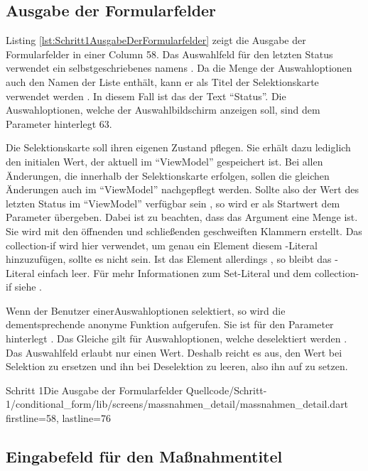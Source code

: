 \subsection{Ausgabe der Formularfelder}

Listing \ref{lst:Schritt1AusgabeDerFormularfelder} zeigt die Ausgabe der Formularfelder in einer Column 58.
Das Auswahlfeld für den letzten Status verwendet ein selbstgeschriebenes  namens  .
Da die Menge der Auswahloptionen auch den Namen der Liste enthält, kann er als Titel der Selektionskarte verwendet werden . In diesem Fall ist das der Text \enquote{Status}.
Die Auswahloptionen, welche  der Auswahlbildschirm anzeigen soll, sind dem Parameter  hinterlegt 63.

Die Selektionskarte soll ihren eigenen Zustand pflegen.
Sie erhält dazu lediglich den initialen Wert, der aktuell im \enquote{ViewModel} gespeichert ist.
Bei allen Änderungen, die innerhalb der Selektionskarte erfolgen, sollen die gleichen Änderungen auch im \enquote{ViewModel} nachgepflegt werden.
Sollte also der Wert des letzten Status im \enquote{ViewModel} verfügbar sein , so wird er als Startwert dem Parameter   übergeben.
Dabei ist zu beachten, dass das Argument eine Menge ist.
Sie wird mit den  öffnenden und schließenden geschweiften Klammern erstellt.
Das collection-if wird hier verwendet, um genau ein Element diesem -Literal hinzuzufügen, sollte es nicht  sein.
Ist das Element allerdings , so bleibt das -Literal einfach leer.
Für mehr Informationen zum Set-Literal und dem collection-if siehe .


Wenn der Benutzer einerAuswahloptionen selektiert, so  wird die dementsprechende anonyme Funktion aufgerufen.
Sie ist für den Parameter  hinterlegt .
Das Gleiche gilt für Auswahloptionen, welche deselektiert werden .
Das Auswahlfeld erlaubt nur einen Wert.
Deshalb reicht es aus, den Wert bei Selektion zu ersetzen und ihn bei Deselektion zu leeren, also ihn auf  zu setzen.


\begin{alexlisting}{Schritt 1}{Die Ausgabe der Formularfelder}
  {Quellcode/Schritt-1/conditional_form/lib/screens/massnahmen_detail/massnahmen_detail.dart}
  {firstline=58, lastline=76}
  \label{lst:Schritt1AusgabeDerFormularfelder}
\end{alexlisting}


\subsection{Eingabefeld für den Maßnahmentitel}


